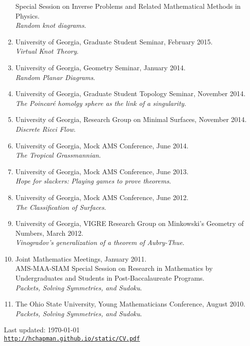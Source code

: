\documentclass[letterpaper]{article}
\def\footerlink{http://hchapman.github.io/static/CV.pdf}
\begin{document}
\begin{enumerate}
  Special Session on Inverse Problems and Related Mathematical Methods in Physics. \\
  \textit{Random knot diagrams}.
\item University of Georgia, Graduate Student Seminar, February
  2015.\\
  \textit{Virtual Knot Theory}.
\item University of Georgia, Geometry Seminar, January 2014.\\
  \textit{Random Planar Diagrams}.
\item University of Georgia, Graduate Student Topology Seminar,
  November 2014.\\
  \textit{The Poincar\'e homolgy sphere as the link of a singularity}.
\item University of Georgia, Research Group on
  Minimal Surfaces, November 2014.\\
  \textit{Discrete Ricci Flow}.
\item University of Georgia, Mock AMS Conference, June 2014.\\
  \textit{The Tropical Grassmannian}.
\item University of Georgia, Mock AMS Conference, June 2013.\\
  \textit{Hope for slackers: Playing games to prove theorems}.
\item University of Georgia, Mock AMS Conference, June 2012.\\
  \textit{The Classification of Surfaces}.
\item University of Georgia, VIGRE Research Group on Minkowski's
  Geometry of Numbers, March 2012.\\
  \textit{Vinogradov's generalization of a theorem of Aubry-Thue}.
\item Joint Mathematics Meetings, January 2011.\\
  AMS-MAA-SIAM Special Session on Research in Mathematics by
  Undergraduates and Students in Post-Baccalaureate Programs.\\
  \textit{Packets, Solving Symmetries, and Sudoku}.
\item The Ohio State University, Young Mathematicians Conference,
  August 2010.\\
  \textit{Packets, Solving Symmetries, and Sudoku}.
\end{enumerate}

\bigskip

\begin{center}
  \begin{footnotesize}
    Last updated: \today \\
    \href{\footerlink}{\texttt{\footerlink}}
  \end{footnotesize}
\end{center}
\end{document}
